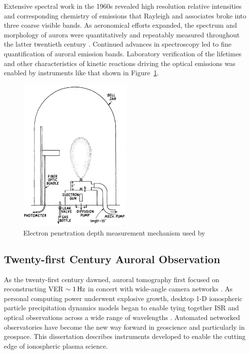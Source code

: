 Extensive spectral work in the 1960s \citep{broadfoot1968} revealed high resolution relative intensities and corresponding chemistry of emissions that Rayleigh and associates broke into three coarse visible bands.
As aeronomical efforts expanded, the spectrum \citep{rees1974} and morphology of aurora were quantitatively and repeatably measured throughout the latter twentieth century \citep{nagy2015}.
Continued advances in spectroscopy led to fine quantification of auroral emission bands.
Laboratory verification of the lifetimes and other characteristics of kinetic reactions driving the optical emissions was enabled by instruments \citep{barrett1976} like that shown in Figure~\ref{fig:BellJar}.
\begin{figure}\centering
    \includegraphics[width=0.5\textwidth]{gfx/BarrettHaysBellJar}
    \caption{Electron penetration depth measurement mechanism used by \citet{barrett1976}}\label{fig:BellJar}
\end{figure}

\subsection{Twenty-first Century Auroral Observation}

As the twenty-first century dawned, auroral tomography first focused on reconstructing VER \citep{bjorn1998} $\sim \unit[1]{Hz}$ in concert with wide-angle camera networks \citep{donovan2006}.
As personal computing power underwent explosive growth, desktop 1-D ionospheric particle precipitation dynamics models \citep{blelly1996a} began to enable tying together ISR and optical observations across a wide range of wavelengths \citep{zettdis,dahlgren2013}.
Automated networked observatories have become the new way forward in geoscience and particularly in geospace.
This dissertation describes instruments developed to enable the cutting edge of ionospheric plasma science.

